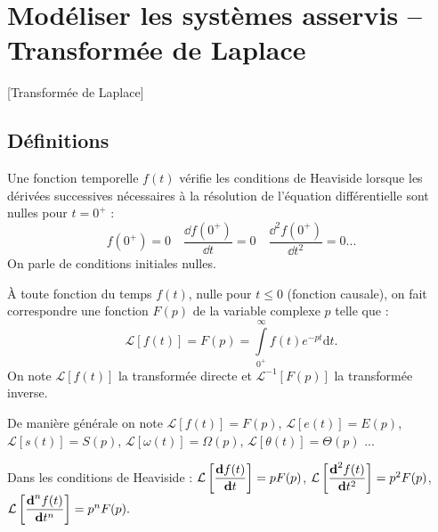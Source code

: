
\section{Modéliser les systèmes asservis -- Transformée de Laplace}[Transformée de Laplace]
\subsection{Définitions}

\begin{defi}  

Une fonction temporelle $f(t)$ vérifie les conditions de Heaviside lorsque les dérivées successives nécessaires à la résolution de l'équation différentielle sont nulles pour $t={0^{+}}$ :
$$
f({0^{+}})=0 \quad \dfrac{\dd f({0^{+}})}{\dd t} = 0 \quad \dfrac{\dd^2f({0^{+}})}{\dd t^2} = 0 ...
$$
On parle de conditions initiales nulles.
\end{defi}

\begin{defi} 
À toute fonction du temps $f(t)$, nulle pour $t\leq0$ (fonction causale), on fait correspondre une fonction $F(p)$ de la variable complexe $p$ telle que :
$$
\mathcal{L}\left[f(t)\right] = F(p)=\int\limits_{0^{+}}^\infty f(t)e^{-pt}\text{d}t.
$$
On note $\mathcal{L}\left[f(t)\right]$ la transformée directe et $\mathcal{L}^{-1}\left[F(p)\right]$ la transformée inverse.

De manière générale on note 
$\mathcal{L}\left[f(t)\right] = F(p)$,
$\mathcal{L}\left[e(t)\right] = E(p)$,
$\mathcal{L}\left[s(t)\right] = S(p)$,
$\mathcal{L}\left[\omega(t)\right] = \Omega(p)$,
$\mathcal{L}\left[\theta(t)\right] = \Theta(p)$ ...
\end{defi}




\begin{resultat} [Dérivation]

Dans les conditions de Heaviside :
$\mathcal{L}\left[ \dfrac{\text{\textbf{d}} f(t)}{\text{\textbf{d}} t}\right] =pF(p)$,
$\mathcal{L}\left[ \dfrac{\text{\textbf{d}}^2f(t)}{\text{\textbf{d}} t^2}\right] =p^2F(p) $,
$\mathcal{L}\left[ \dfrac{\text{\textbf{d}}^nf(t)}{\text{\textbf{d}} t^n}\right] =p^nF(p).$

\end{resultat}



